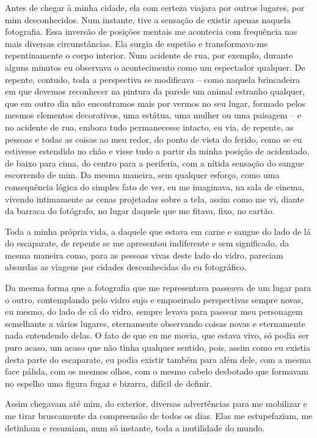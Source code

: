 Antes de chegar à minha cidade, ela com certeza viajara por outros lugares, por mim desconhecidos. Num instante, tive a sensação de existir apenas naquela fotografia. Essa inversão de posições mentais me acontecia com frequência nas mais diversas circunstâncias. Ela surgia de supetão e transformava-me repentinamente o corpo interior. Num acidente de rua, por exemplo, durante alguns minutos eu observava o acontecimento como um espectador qualquer. De repente, contudo, toda a perspectiva se modificava -- como naquela brincadeira em que devemos reconhecer na pintura da parede um animal estranho qualquer, que em outro dia não encontramos mais por vermos no seu lugar, formado pelos mesmos elementos decorativos, uma estátua, uma mulher ou uma paisagem -- e no acidente de rua, embora tudo permanecesse intacto, eu via, de repente, as pessoas e todas as coisas ao meu redor, do ponto de vista do ferido, como se eu estivesse estendido no chão e visse tudo a partir da minha posição de acidentado, de baixo para cima, do centro para a periferia, com a nítida sensação do sangue escorrendo de mim. Da mesma maneira, sem qualquer esforço, como uma consequência lógica do simples fato de ver, eu me imaginava, na sala de cinema, vivendo intimamente as cenas projetadas sobre a tela, assim como me vi, diante da barraca do fotógrafo, no lugar daquele que me fitava, fixo, no cartão.

Toda a minha própria vida, a daquele que estava em carne e sangue do lado de lá do escaparate, de repente se me apresentou indiferente e sem significado, da mesma maneira como, para as pessoas vivas deste lado do vidro, pareciam absurdas as viagens por cidades desconhecidas do eu fotográfico.

Da mesma forma que a fotografia que me representava passeava de um lugar para o outro, contemplando pelo vidro sujo e empoeirado perspectivas sempre novas, eu mesmo, do lado de cá do vidro, sempre levava para passear meu personagem semelhante a vários lugares, eternamente observando coisas novas e eternamente nada entendendo delas. O fato de que eu me movia, que estava vivo, só podia ser puro acaso, um acaso que não tinha qualquer sentido, pois, assim como eu existia desta parte do escaparate, eu podia existir também para além dele, com a mesma face pálida, com os mesmos olhos, com o mesmo cabelo desbotado que formavam no espelho uma figura fugaz e bizarra, difícil de definir.

Assim chegavam até mim, do exterior, diversas advertências para me mobilizar e me tirar bruscamente da compreensão de todos os dias. Elas me estupefaziam, me detinham e resumiam, num só instante, toda a inutilidade do mundo.

